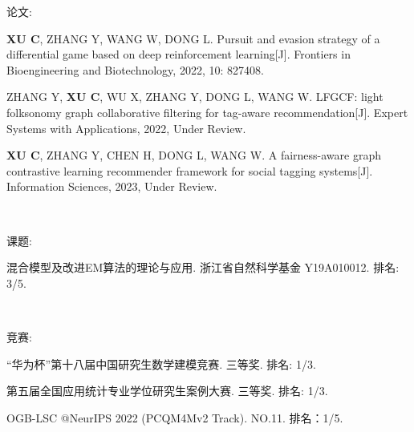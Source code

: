 \newpage
\pagestyle{fancy}
\begin{center}
\heiti{}
\end{center}


论文:

\textbf{XU C}, ZHANG Y, WANG W, DONG L. Pursuit and evasion strategy of a differential game based on deep reinforcement learning[J]. Frontiers in Bioengineering and Biotechnology, 2022, 10: 827408.

ZHANG Y, \textbf{XU C}, WU X, ZHANG Y, DONG L, WANG W. LFGCF: light folksonomy graph collaborative filtering for tag-aware recommendation[J]. Expert Systems with Applications, 2022, Under Review.

\textbf{XU C}, ZHANG Y, CHEN H, DONG L, WANG W. A fairness-aware graph contrastive learning recommender framework for social tagging systems[J]. Information Sciences, 2023, Under Review.

\

课题:

混合模型及改进EM算法的理论与应用. 浙江省自然科学基金 Y19A010012. 排名: 3/5.

\

竞赛:

“华为杯”第十八届中国研究生数学建模竞赛. 三等奖. 排名: 1/3.

第五届全国应用统计专业学位研究生案例大赛. 三等奖. 排名: 1/3.

OGB-LSC @NeurIPS 2022 (PCQM4Mv2 Track). NO.11. 排名：1/5.
